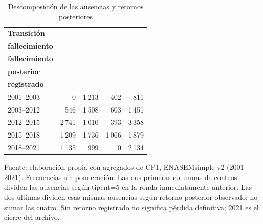 \begin{table}[!htbp]
\centering
\caption{Descomposición de las ausencias y retornos posteriores}\label{tab:cp1-ausencias}
\small\setlength{\tabcolsep}{4pt}
\renewcommand{\arraystretch}{1.15}
\begin{tabular}{lrrrr}
\toprule
\textbf{Transición} & \shortstack[c]{\textbf{Con}\\\textbf{fallecimiento}} & \shortstack[c]{\textbf{Sin}\\\textbf{fallecimiento}} & \shortstack[c]{\textbf{Retorno}\\\textbf{posterior}} & \shortstack[c]{\textbf{Sin retorno}\\\textbf{registrado}} \\
\midrule
2001--2003 & 0 & 1\,213 & 402 & 811 \\
2003--2012 & 546 & 1\,508 & 603 & 1\,451 \\
2012--2015 & 2\,741 & 1\,010 & 393 & 3\,358 \\
2015--2018 & 1\,209 & 1\,736 & 1\,066 & 1\,879 \\
2018--2021 & 1\,135 & 999 & 0 & 2\,134 \\
\bottomrule
\end{tabular}
\par\medskip
\parbox{\linewidth}{\footnotesize Fuente: elaboración propia con agregados de CP1, ENASEMsimple v2 (2001--2021). Frecuencias sin ponderación. Las dos primeras columnas de conteos dividen las ausencias según tipent=5 en la ronda inmediatamente anterior. Las dos últimas dividen esas mismas ausencias según retorno posterior observado; no sumar las cuatro. Sin retorno registrado no significa pérdida definitiva; 2021 es el cierre del archivo.}
\end{table}
